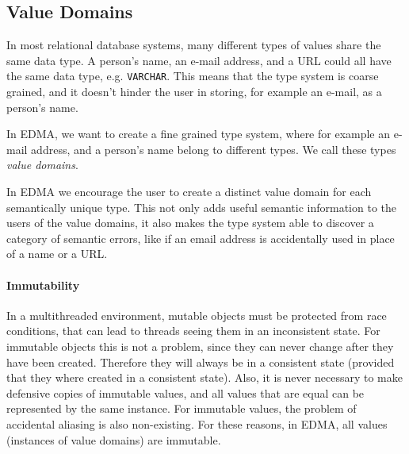 
\subsection{\label{sub:Value-domains}Value Domains}

In most relational database systems, many different types of values
share the same data type. A person's name, an e-mail address, and
a URL could all have the same data type, e.g. \texttt{VARCHAR}. This
means that the type system is coarse grained, and it doesn't hinder
the user in storing, for example an e-mail, as a person's name.

In EDMA, we want to create a fine grained type system, where for example
an e-mail address, and a person's name belong to different types.
We call these types \emph{value domains}.

In EDMA we encourage the user to create a distinct value domain for
each semantically unique type. This not only adds useful semantic
information to the users of the value domains, it also makes the type
system able to discover a category of semantic errors, like if an
email address is accidentally used in place of a name or a URL.


\paragraph{Immutability}

In a multithreaded environment, mutable
objects must be protected from race conditions, that can lead to threads
seeing them in an inconsistent state. For immutable
objects this is not a problem, since they can never change after they
have been created. Therefore they will always be in a consistent state
(provided that they where created in a consistent state). Also, it
is never necessary to make defensive copies of immutable values, and
all values that are equal can be represented by the same instance.
For immutable values, the problem of accidental aliasing is also non-existing\cite{hogg1992geneva}.
For these reasons, in EDMA, all values (instances of value domains)
are immutable.


